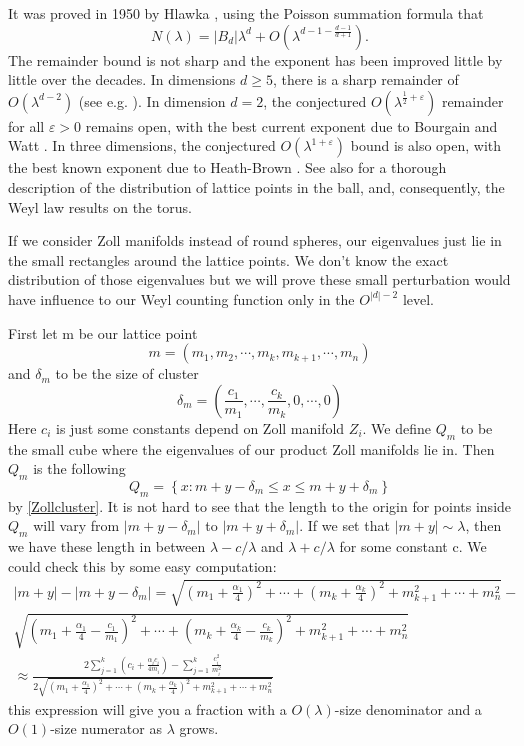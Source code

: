 \documentclass[10pt]{amsart}
\renewcommand{\epsilon}{\varepsilon}
\renewcommand{\epsilon}{\varepsilon}
\newcommand{\1}{\mathbb{1}}
\begin{document}
It was proved in 1950 by Hlawka \cite{Hlawka1950}, using the Poisson summation formula that 
\[
    N(\lambda) = |B_d| \lambda^{d} + O(\lambda^{d-1 - \frac{d-1}{d+1}}).
\]
The remainder bound is not sharp and the exponent has been improved little by little over the decades. In dimensions $d \geq 5$, there is a sharp remainder of $O(\lambda^{d-2})$ (see e.g. \cite{Fricker82}). In dimension $d = 2$, the conjectured $O(\lambda^{\frac12 + \epsilon})$ remainder for all $\epsilon > 0$ remains open, with the best current exponent due to Bourgain and Watt \cite{BourgainWatt}. In three dimensions, the conjectured $O(\lambda^{1+\epsilon})$ bound is also open, with the best known exponent due to Heath-Brown \cite{HeathBrown}. See also \cite{huxley1996area, EkkehardKrätzel1992} for a thorough description of the distribution of lattice points in the ball, and, consequently, the Weyl law results on the torus.

If we consider Zoll manifolds instead of round spheres, our eigenvalues just lie in the small rectangles around the lattice points. We don't know the exact distribution of those eigenvalues but we will prove these small perturbation would have influence to our Weyl counting function only in the $O^{|d| -2}$ level.

First let m be our lattice point
\[
 m = \left( m_1,m_2,\cdots, m_k, m_{k+1}, \cdots, m_n \right)
\]
and $\delta_m$ to be the size of cluster
\[
\delta_m = \left(\frac{c_1}{m_1}, \cdots, \frac{c_k}{m_k},0,\cdots, 0\right)
\]
Here $c_i$ is just some constants depend on Zoll manifold $Z_i$. We define $Q_m$ to be the small cube where the eigenvalues of our product Zoll manifolds lie in. Then $Q_m$ is the following
\begin{equation}
Q_m = \left\{ x :m + y - \delta_m \le x \le  m+ y + \delta_m \right\}
\end{equation}
by \eqref{Zollcluster}. It is not hard to see that the length to the origin for points inside $Q_m$ will vary from $|m+y-\delta_m|$ to $|m+y+\delta_m|$. If we set that $|m+y| \sim \lambda$, then we have these length in between $\lambda - c/\lambda$ and $\lambda + c/\lambda$ for some constant c. We could check this by some easy computation:
\begin{align*}
    |m+y| - |m + y - \delta_m| = \sqrt{(m_1+\frac{\alpha_1}{4})^2+\cdots+(m_k+\frac{\alpha_k}{4})^2+m_{k+1}^2+\cdots+m_n^2} -\\
    \sqrt{(m_1+\frac{\alpha_1}{4}-\frac{c_1}{m_1})^2+\cdots+(m_k+\frac{\alpha_k}{4}-\frac{c_k}{m_k})^2+m_{k+1}^2+\cdots+m_n^2}\\
    \approx \frac{2\sum_{j=1}^k( c_i+ \frac{\alpha_ic_i}{4m_i}) - \sum_{j=1}^k \frac{c_i^2}{m_i^2}}{2 \sqrt{(m_1+\frac{\alpha_1}{4})^2+\cdots+(m_k+\frac{\alpha_k}{4})^2+m_{k+1}^2+\cdots+m_n^2}}
\end{align*}
this expression will give you a fraction with a $O(\lambda)$-size denominator and a $O(1)$-size numerator as $\lambda$ grows.
\end{document}

